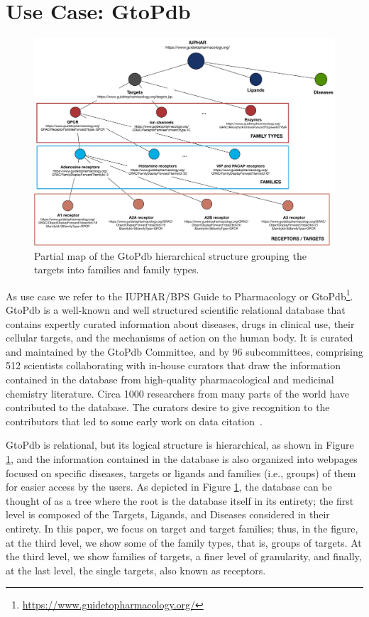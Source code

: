 \section{Use Case: GtoPdb}
\label{section:use_case}

\begin{figure}[t]
\centering
  \includegraphics[width=.9\textwidth]{figures/iuphar_schema}
  \caption{Partial map of the GtoPdb hierarchical structure grouping the targets into families and family types.}
  \label{figure:iuphar_schema}
\end{figure}

As use case we refer to the IUPHAR/BPS Guide to Pharmacology \citep{iuphar2018} or  GtoPdb\footnote{\url{https://www.guidetopharmacology.org/}}.
GtoPdb is a well-known and well structured scientific relational database that contains expertly curated information about diseases, drugs in clinical use, their cellular targets, and the mechanisms of action on the human body. 
It is curated and maintained by the GtoPdb Committee, and by 96 subcommittees, comprising 512 scientists collaborating with in-house curators that draw the information contained in the database from high-quality pharmacological and medicinal chemistry literature.
Circa 1000 researchers from many parts of the world have contributed to the database. The curators desire to give recognition to the contributors that led to some early work on data citation~\citep{buneman2006cite}.  

GtoPdb is relational, but its logical structure is hierarchical, as shown in Figure \ref{figure:iuphar_schema}, and the information contained in the database is also organized into webpages focused on specific diseases, targets or ligands and families (i.e., groups) of them for easier access by the users. 
As depicted in Figure \ref{figure:iuphar_schema}, the database can be thought of as a tree where the root is the database itself in its entirety; the first level is composed of the Targets, Ligands, and Diseases considered in their entirety. 
In this paper, we focus on target and target families; thus, in the figure, at the third level, we show some of the family types, that is, groups of targets. At the third level, we show families of targets, a finer level of granularity, and finally, at the last level, the single targets, also known as receptors. 

